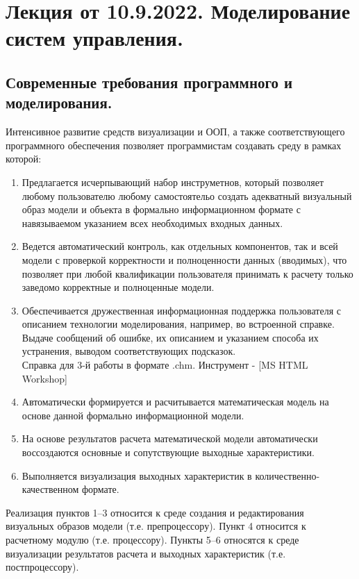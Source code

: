\section{Лекция от 10.9.2022. Моделирование систем управления.}
\subsection{Современные требования программного и моделирования.}
Интенсивное развитие средств визуализации и ООП, а также соответствующего
программного обеспечения позволяет программистам создавать среду в рамках
которой:
\begin{enumerate}
  \item Предлагается исчерпывающий набор инструметнов, который позволяет любому
    пользователю любому самостоятельо создать адекватный визуальный образ модели
    и объекта в формально информационном формате с навязываемом указанием всех
    необходимых входных данных.
  \item Ведется автоматический контроль, как отдельных компонентов, так и всей
    модели с проверкой корректности и полноценности данных (вводимых), что
    позволяет при любой квалификации пользователя принимать к расчету только
    заведомо корректные и полноценные модели.
  \item Обеспечивается дружественная информационная поддержка пользователя с
    описанием технологии моделирования, например, во встроенной справке. Выдаче
    сообщений об ошибке, их описанием и указанием способа их устранения, выводом
    соответствующих подсказок.\\{\ttfamily Справка для 3-й работы в формате
    .chm. Инструмент - [MS HTML Workshop]}
  \item Автоматически формируется и расчитывается математическая модель на
    основе данной формально информационной модели.
  \item На основе результатов расчета математической модели автоматически
    воссоздаются основные и сопутствующие выходные характеристики.
  \item Выполняется визуализация выходных характеристик в
    количественно-качественном формате.
\end{enumerate}\par
Реализация пунктов 1--3 относится к среде создания и редактирования визуальных
образов модели (т.е. препроцессору). Пункт 4 относится к расчетному модулю (т.е.
процессору). Пункты 5--6 относятся к среде визуализации результатов расчета и
выходных характеристик (т.е. постпроцессору).\par

